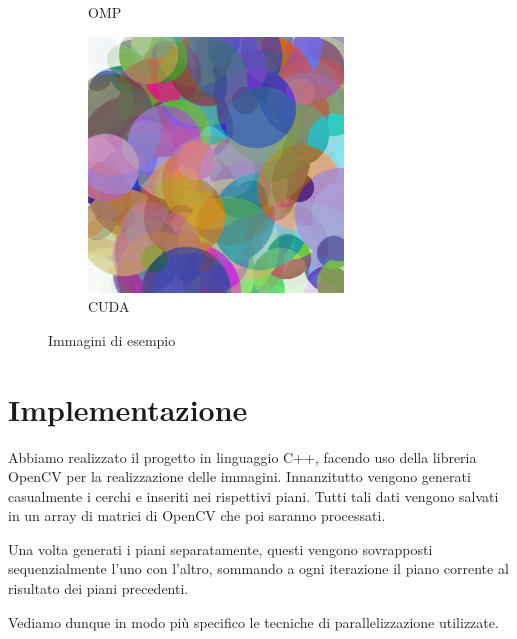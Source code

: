 \documentclass[11pt]{article}
\begin{document}
\begin{figure}[h!]
\begin{subfigure}{0.32\textwidth}
            \caption{OMP}
        \end{subfigure}%
        \hfill
        \begin{subfigure}{0.32\textwidth}
            \centering
            \includegraphics[width=\textwidth]{../results/img/cuda/10000}
            \caption{CUDA}
        \end{subfigure}
        \caption{Immagini di esempio}
        \label{fig:example-images}
    \end{figure}

    \section{Implementazione}
    Abbiamo realizzato il progetto in linguaggio C++, facendo uso della libreria OpenCV per la realizzazione delle immagini.
    Innanzitutto vengono generati casualmente i cerchi e inseriti nei rispettivi piani.
    Tutti tali dati vengono salvati in un array di matrici di OpenCV che poi saranno processati.
    
    Una volta generati i piani separatamente, questi vengono sovrapposti sequenzialmente l'uno con l'altro, sommando a ogni iterazione il piano corrente al risultato dei piani precedenti.
    
    Vediamo dunque in modo più specifico le tecniche di parallelizzazione utilizzate.
\end{document}
